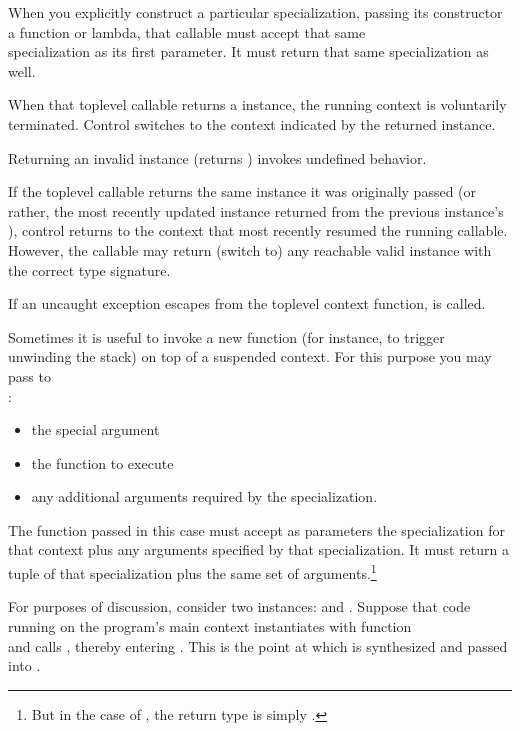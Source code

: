 When you explicitly construct a particular \ectxargs specialization, passing
its constructor a function or lambda, that callable must accept that same\\
\ectxargs specialization as its first parameter. It must return that
same \ectxargs specialization as well.

When that toplevel callable returns a \ectx instance, the running context is
voluntarily terminated. Control switches to the context indicated by the
returned \ectx instance.

Returning an invalid \ectx instance (\opbool returns ) invokes
undefined behavior.

If the toplevel callable returns the same \ectx instance it was originally
passed (or rather, the most recently updated instance returned from the
previous instance's \op), control returns to the context that most recently
resumed the running callable. However, the callable may return (switch to)
any reachable valid \ectx instance with the correct type signature.


If an uncaught exception escapes from the toplevel context function,
 is called.


Sometimes it is useful to invoke a new function (for instance, to trigger
unwinding the stack) on top of a suspended context. For this purpose you may
pass to\\
\ectxop:

\begin{itemize}
  \item the special argument 
  \item the function to execute
  \item any additional arguments required by the \ectx specialization.
\end{itemize}

The function passed in this case must accept as parameters the \ectx
specialization for that context plus any arguments specified by that
specialization. It must return a tuple of that \ectx specialization plus the
same set of arguments.\footnote{But in the case of \ectxvoid, the return type
is simply \ectxvoid.}

For purposes of discussion, consider two \ectxvoid
instances:  and . Suppose that code running
on the program's main context instantiates  with function\\
\ectxvoid{} and calls , thereby
entering . This is the point at which  is synthesized
and passed into .

